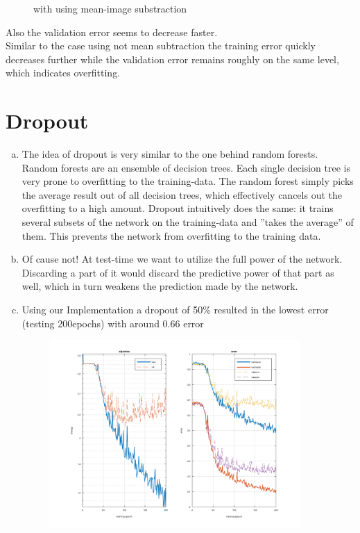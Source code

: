 \documentclass[12pt]{article}
\begin{document}
\begin{enumerate}[a)]
\begin{figure}[H]
                \caption{with using mean-image substraction}
        \end{figure}
        Also the validation error seems to decrease faster.\\
        Similar to the case using not mean subtraction the training error quickly decreases further while the validation error remains roughly on the same level, which indicates overfitting.
\end{enumerate}


\newpage
\section{Dropout}

\begin{enumerate}[a)]
    \item 
        The idea of dropout is very similar to the one behind random forests. Random forests are an ensemble of decision trees. Each single decision tree is very prone to overfitting to the training-data. The random forest simply picks the average result out of all decision trees, which effectively cancels out the overfitting to a high amount. Dropout intuitively does the same: it trains several subsets of the network on the training-data and ''takes the average'' of them. This prevents the network from overfitting to the training data.
    \item
        Of cause not! At test-time we want to utilize the full power of the network. Discarding a part of it would discard the predictive power of that part as well, which in turn weakens the prediction made by the network.
    \item
        Using our Implementation a dropout of 50\% resulted in the lowest error (testing 200epochs) with around 0.66 error 
        \begin{figure}[H]
            \centering
                \includegraphics[width=0.9\textwidth]{Plots/3_50_200.png}

\end{figure}
\end{enumerate}
\end{document}
